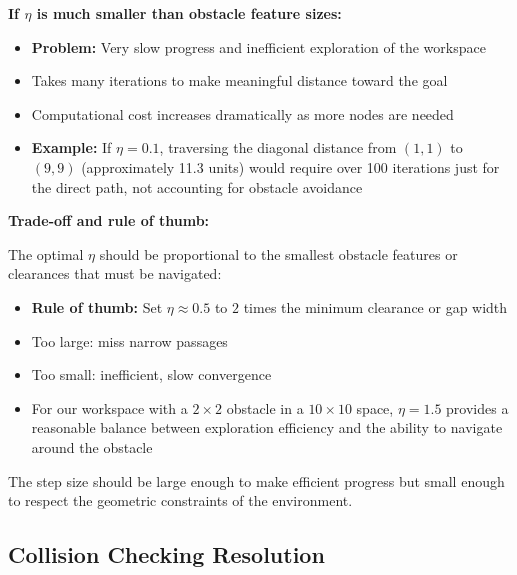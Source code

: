 \documentclass[11pt]{article}
\begin{document}
\textbf{If $\eta$ is much smaller than obstacle feature sizes:}
\begin{itemize}
    \item \textbf{Problem:} Very slow progress and inefficient exploration of the workspace
    \item Takes many iterations to make meaningful distance toward the goal
    \item Computational cost increases dramatically as more nodes are needed
    \item \textbf{Example:} If $\eta = 0.1$, traversing the diagonal distance from $(1,1)$ to $(9,9)$ (approximately 11.3 units) would require over 100 iterations just for the direct path, not accounting for obstacle avoidance
\end{itemize}

\textbf{Trade-off and rule of thumb:}

The optimal $\eta$ should be proportional to the smallest obstacle features or clearances that must be navigated:
\begin{itemize}
    \item \textbf{Rule of thumb:} Set $\eta \approx 0.5$ to $2$ times the minimum clearance or gap width
    \item Too large: miss narrow passages
    \item Too small: inefficient, slow convergence
    \item For our workspace with a $2 \times 2$ obstacle in a $10 \times 10$ space, $\eta = 1.5$ provides a reasonable balance between exploration efficiency and the ability to navigate around the obstacle
\end{itemize}

The step size should be large enough to make efficient progress but small enough to respect the geometric constraints of the environment.

\subsection{Collision Checking Resolution}
\end{document}
